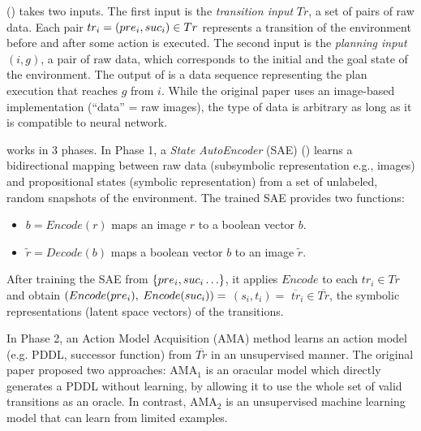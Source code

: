 \latentplanner () takes two inputs.
The first input is the \emph{transition input} $Tr$, a set of pairs of raw data.
Each pair $tr_i=(pre_i, suc_i) \in Tr$ represents a transition of the environment before and after some action is executed.
The second input is the \emph{planning input} $(i, g)$, a pair of raw data, which corresponds to the initial and the goal state of the environment.
The output of \latentplanner is a data sequence representing the plan execution that reaches $g$ from $i$.
While the original paper uses an image-based implementation (``data'' = raw images),
the type of data is arbitrary as long as it is compatible to neural network.


\latentplanner works in 3 phases.
In Phase 1, a \emph{State AutoEncoder} (SAE) () learns a bidirectional mapping between raw data (subsymbolic representation e.g., images)
 and propositional states (symbolic representation) from a set of unlabeled, random snapshots of the environment.
The trained SAE provides two functions:
\begin{itemize} %
\setlength{\itemsep}{-0.3em}
\item $b=Encode(r)$ maps an image  $r$ to a boolean vector $b$.
\item $\tilde{r}=Decode(b)$ maps a boolean vector $b$ to an image $\tilde{r}$.
\end{itemize}
After training the SAE from ${\left\{pre_i, suc_i\ldots\right\}}$,
it applies $Encode$ to each $tr_i \in Tr$ and obtain $(Encode(pre_i),$ $Encode(suc_i))=$ $(s_i,t_i)=$ $\overline{tr}_i\in \overline{Tr}$,
the symbolic representations (latent space vectors) of the transitions.

In Phase 2, an Action Model Acquisition (AMA) method learns an action model (e.g. PDDL, successor function) from $\overline{Tr}$ in an unsupervised manner.
The original paper proposed two approaches: AMA$_1$ is an oracular model which directly generates a PDDL without learning,
by allowing it to use the whole set of valid transitions as an oracle.
In contrast, AMA$_2$ is an unsupervised machine learning model that can learn from limited examples.

